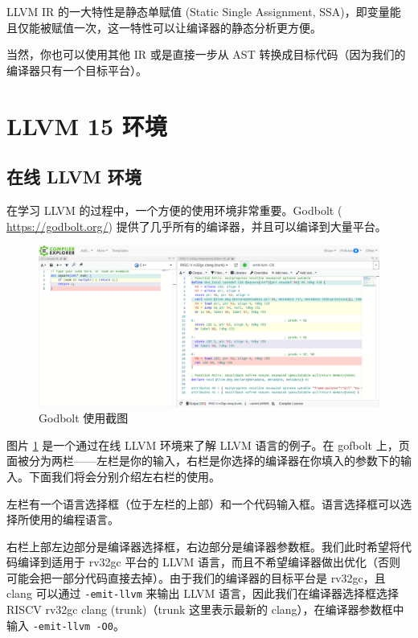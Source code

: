 LLVM IR 的一大特性是静态单赋值 (Static Single Assignment,
SSA)，即变量能且仅能被赋值一次，这一特性可以让编译器的静态分析更方便。

当然，你也可以使用其他 IR 或是直接一步从 AST
转换成目标代码（因为我们的编译器只有一个目标平台）。

\section{LLVM 15 环境}

\subsection{在线 LLVM 环境}\label{online-LLVM-env}

在学习 LLVM 的过程中，一个方便的使用环境非常重要。Godbolt (
\url{https://godbolt.org/}) 提供了几乎所有的编译器，并且可以编译到大量平台。

\begin{figure}[htb]
\centering
\includegraphics[scale=0.3]{image/godbolt.png}
\caption{Godbolt 使用截图}
\label{godbolt_sreenshot}
\end{figure}

图片 \ref{godbolt_sreenshot} 是一个通过在线 LLVM 环境来了解 LLVM 语言的例子。在
gofbolt 上，页面被分为两栏——左栏是你的输入，右栏是你选择的编译器在你填入的参数下的输入。下面我们将会分别介绍左右栏的使用。

左栏有一个语言选择框（位于左栏的上部）和一个代码输入框。语言选择框可以选择所使用的编程语言。

右栏上部左边部分是编译器选择框，右边部分是编译器参数框。我们此时希望将代码编译到适用于 rv32gc
平台的 LLVM 语言，而且不希望编译器做出优化（否则可能会把一部分代码直接去掉）。由于我们的编译器的目标平台是
rv32gc，且 clang 可以通过 \texttt{-emit-llvm} 来输出 LLVM 语言，因此我们在编译器选择框选择
RISCV rv32gc clang (trunk)（trunk 这里表示最新的 clang），在编译器参数框中输入 \texttt{-emit-llvm -O0}。

